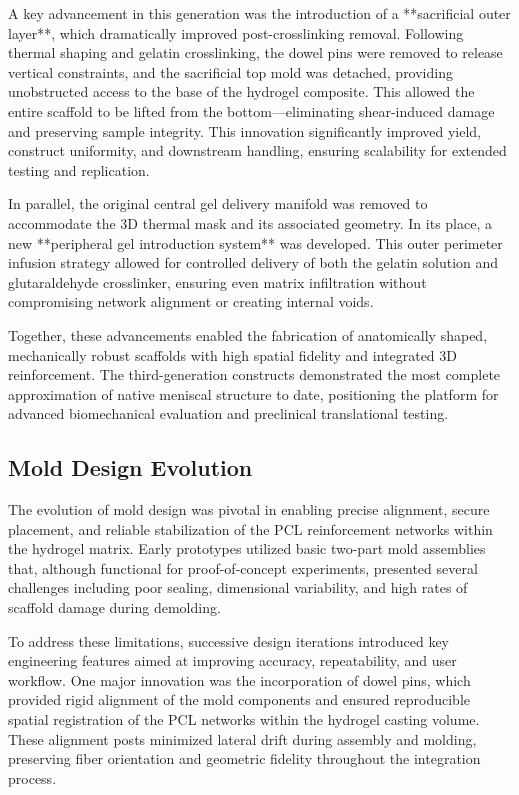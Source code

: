A key advancement in this generation was the introduction of a **sacrificial outer layer**, which dramatically improved post-crosslinking removal. Following thermal shaping and gelatin crosslinking, the dowel pins were removed to release vertical constraints, and the sacrificial top mold was detached, providing unobstructed access to the base of the hydrogel composite. This allowed the entire scaffold to be lifted from the bottom—eliminating shear-induced damage and preserving sample integrity. This innovation significantly improved yield, construct uniformity, and downstream handling, ensuring scalability for extended testing and replication.

In parallel, the original central gel delivery manifold was removed to accommodate the 3D thermal mask and its associated geometry. In its place, a new **peripheral gel introduction system** was developed. This outer perimeter infusion strategy allowed for controlled delivery of both the gelatin solution and glutaraldehyde crosslinker, ensuring even matrix infiltration without compromising network alignment or creating internal voids.

Together, these advancements enabled the fabrication of anatomically shaped, mechanically robust scaffolds with high spatial fidelity and integrated 3D reinforcement. The third-generation constructs demonstrated the most complete approximation of native meniscal structure to date, positioning the platform for advanced biomechanical evaluation and preclinical translational testing.

\subsection{Mold Design Evolution}

The evolution of mold design was pivotal in enabling precise alignment, secure placement, and reliable stabilization of the PCL reinforcement networks within the hydrogel matrix. Early prototypes utilized basic two-part mold assemblies that, although functional for proof-of-concept experiments, presented several challenges including poor sealing, dimensional variability, and high rates of scaffold damage during demolding.

To address these limitations, successive design iterations introduced key engineering features aimed at improving accuracy, repeatability, and user workflow. One major innovation was the incorporation of dowel pins, which provided rigid alignment of the mold components and ensured reproducible spatial registration of the PCL networks within the hydrogel casting volume. These alignment posts minimized lateral drift during assembly and molding, preserving fiber orientation and geometric fidelity throughout the integration process.

